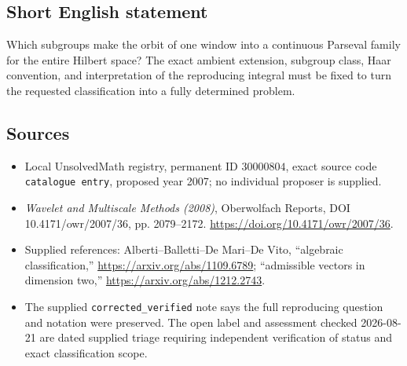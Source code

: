 \documentclass[11pt]{article}
\begin{document}
\subsection{Short English statement}
Which subgroups make the orbit of one window into a continuous Parseval family for the entire Hilbert space? The exact ambient extension, subgroup class, Haar convention, and interpretation of the reproducing integral must be fixed to turn the requested classification into a fully determined problem.
\subsection{Sources}
\begin{itemize}
\item Local UnsolvedMath registry, permanent ID \(30000804\), exact source code \texttt{catalogue entry}, proposed year 2007; no individual proposer is supplied.
\item \emph{Wavelet and Multiscale Methods (2008)}, Oberwolfach Reports, DOI 10.4171/owr/2007/36, pp. 2079--2172. \url{https://doi.org/10.4171/owr/2007/36}.
\item Supplied references: Alberti--Balletti--De Mari--De Vito, ``algebraic classification,'' \url{https://arxiv.org/abs/1109.6789}; ``admissible vectors in dimension two,'' \url{https://arxiv.org/abs/1212.2743}.
\item The supplied \texttt{corrected\_verified} note says the full reproducing question and notation were preserved. The open label and assessment checked 2026-08-21 are dated supplied triage requiring independent verification of status and exact classification scope.
\end{itemize}
\end{document}
